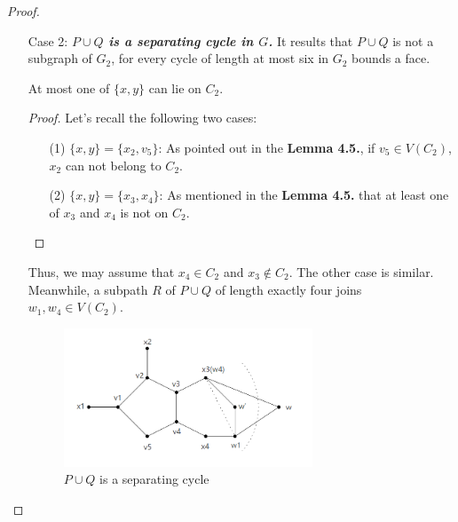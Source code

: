 \begin{proof}
\begin{itemize}
\begin{proof}
\begin{itemize}
\begin{figure}[H]
            \caption{Path is $x_4u_1u_2v_3$.} %
            \label{figure} %
        \end{figure}
        Then $u_2 = x_3$. As discussed in \textbf{Lemma 4.5.}, at most one of $x_3, x_4$ can lie on $C_2$. Therefore, $x_4u_1u_2(x_3)v_3v_4$ would form a separating cycle of length five, which is a contradiction.
    \end{itemize}
    \end{proof}
    
    \item[Case 2:]\textit{\textbf{$P \cup Q$ is a separating cycle in $G$.}} It results that $P \cup Q$ is not a subgraph of $G_2$, for every cycle of length at most six in $G_2$ bounds a face.  
    
    \begin{claim}
    At most one of $\{x, y\}$ can lie on $C_2$.
    \end{claim}
\begin{proof}
    Let's recall the following two cases:
    \begin{itemize}
        \item[(1)] \textit{\textbf{$\{x, y\} = \{x_2, v_5\}$}}: As pointed out in the \textbf{Lemma 4.5.}, if $v_5 \in V(C_2)$, $x_2$ can not belong to $C_2$.
        \item[(2)] \textit{\textbf{$\{x, y\} = \{x_3, x_4\}$}}: As mentioned in the \textbf{Lemma 4.5.} that at least one of $x_3$ and $x_4$ is not on $C_2$.
    \end{itemize}
\end{proof}
Thus, we may assume that $x_4 \in C_2$ and $x_3 \notin C_2$. The other case is similar. Meanwhile, a subpath $R$ of $P \cup Q$ of length exactly four joins $w_1, w_4 \in V(C_2)$. 
\begin{figure}[H] %
    \centering %
    \includegraphics[width=0.7\textwidth]{figure/lemma2.2.png} 
    \caption{$P \cup Q$ is a separating cycle} %

\end{figure}
\end{itemize}
\end{proof}
